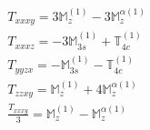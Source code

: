 \documentclass[fleqn,8pt,landscape]{jsarticle}
\begin{document}
\begin{align*}
& T_{xxxy} = 3 \mathbb{M}_{z}^{(1)} - 3 \mathbb{M}_{z}^{\alpha(1)} \\
& T_{xxxz} = - 3 \mathbb{M}_{3s}^{(1)} + \mathbb{T}_{4c}^{(1)} \\
& T_{yyzx} = - \mathbb{M}_{3s}^{(1)} - \mathbb{T}_{4c}^{(1)} \\
& T_{zzxy} = \mathbb{M}_{z}^{(1)} + 4 \mathbb{M}_{z}^{\alpha(1)} \\
& \frac{T_{xxxy}}{3} = \mathbb{M}_{z}^{(1)} - \mathbb{M}_{z}^{\alpha(1)}
\end{align*}
\end{document}
